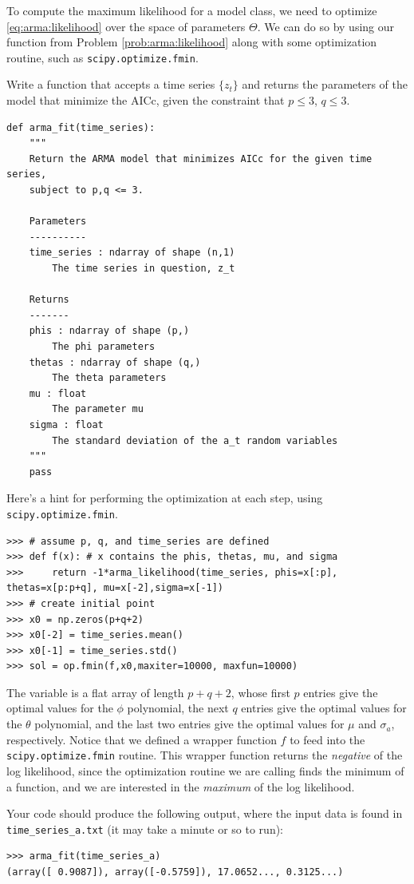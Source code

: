 To compute the maximum likelihood for a model class, we need to optimize
\ref{eq:arma:likelihood} over the space of parameters $\Theta$. We can do so
by using our function from Problem \ref{prob:arma:likelihood} along with some
optimization routine, such as {\tt scipy.optimize.fmin}.

\begin{problem}
\label{prob:arma:mle}
Write a function that accepts a time series $\{z_t\}$ and returns the
parameters of the model that minimize the AICc, given the constraint that $p
\leq 3$, $q \leq 3$.

\begin{lstlisting}
def arma_fit(time_series):
    """
    Return the ARMA model that minimizes AICc for the given time series,
    subject to p,q <= 3.

    Parameters
    ----------
    time_series : ndarray of shape (n,1)
        The time series in question, z_t

    Returns
    -------
    phis : ndarray of shape (p,)
        The phi parameters
    thetas : ndarray of shape (q,)
        The theta parameters
    mu : float
        The parameter mu
    sigma : float
        The standard deviation of the a_t random variables
    """
    pass
\end{lstlisting}
\vspace{3mm} \noindent
Here's a hint for performing the optimization at each step, using {\tt scipy.optimize.fmin}.
\begin{lstlisting}
>>> # assume p, q, and time_series are defined
>>> def f(x): # x contains the phis, thetas, mu, and sigma
>>>     return -1*arma_likelihood(time_series, phis=x[:p], thetas=x[p:p+q], mu=x[-2],sigma=x[-1])
>>> # create initial point
>>> x0 = np.zeros(p+q+2)
>>> x0[-2] = time_series.mean()
>>> x0[-1] = time_series.std()
>>> sol = op.fmin(f,x0,maxiter=10000, maxfun=10000)
\end{lstlisting}
\vspace{3mm} \noindent
The variable  is a flat array of length $p+q+2$, whose first $p$ entries give the optimal values
for the $\phi$ polynomial, the next $q$ entries give the optimal values for the $\theta$ polynomial,
and the last two entries give the optimal values for $\mu$ and $\sigma_a$, respectively.
Notice that we defined a wrapper function $f$ to feed into the {\tt scipy.optimize.fmin} routine.
This wrapper function returns the \emph{negative} of the log likelihood, since the optimization routine we are
calling finds the minimum of a function, and we are interested in the \emph{maximum} of the log likelihood.

Your code should produce the following output, where the input data is found in
{\tt time\_series\_a.txt} (it may take a minute or so to run):
\begin{lstlisting}
>>> arma_fit(time_series_a)
(array([ 0.9087]), array([-0.5759]), 17.0652..., 0.3125...)
\end{lstlisting}
\end{problem}


